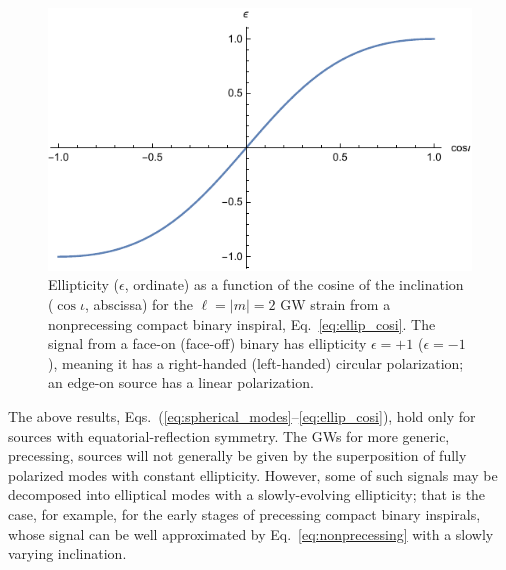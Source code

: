 \documentclass[aps,prd,twocolumn,superscriptaddress,preprintnumbers,floatfix,nofootinbib]{revtex4-2}
\newcommand*{\eq}[1]{Eq.~\eqref{eq:#1}}
\begin{document}
\begin{figure}
\includegraphics[width=\columnwidth]{ellip_cosi}
\caption{Ellipticity ($\epsilon$, ordinate) as a function of the cosine of the inclination ($\cos\iota$, abscissa) for the $\ell = |m| = 2$ GW strain from a nonprecessing compact binary inspiral, Eq.~\eqref{eq:ellip_cosi}. The signal from a face-on (face-off) binary has ellipticity $\epsilon = +1$ ($\epsilon=-1$), meaning it has a right-handed (left-handed) circular polarization; an edge-on source has a linear polarization.}
\label{fig:ellip_cosi}
\end{figure}

The above results, Eqs.~(\ref{eq:spherical_modes}--\ref{eq:ellip_cosi}), hold only for sources with equatorial-reflection symmetry.
The GWs for more generic, precessing, sources will not generally be given by the superposition of fully polarized modes with constant ellipticity.
However, some of such signals may be decomposed into elliptical modes with a slowly-evolving ellipticity; that is the case, for example, for the early stages of precessing compact binary inspirals, whose signal can be well approximated by \eq{nonprecessing} with a slowly varying inclination.
\end{document}
